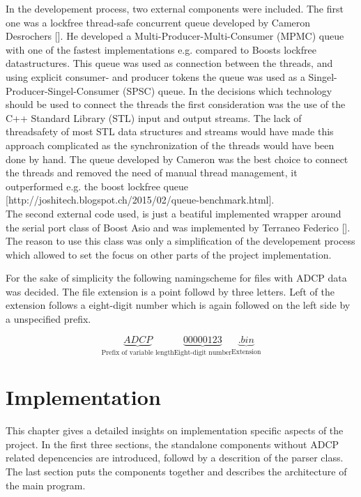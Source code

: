 In the developement process, two external components were included. The first one was a lockfree thread-safe concurrent queue developed by Cameron Desrochers []. He developed a Multi-Producer-Multi-Consumer (MPMC) queue with one of the fastest implementations e.g. compared to Boosts lockfree datastructures. This queue was used as connection between the threads, and using explicit consumer- and producer tokens the queue was used as a Singel-Producer-Singel-Consumer (SPSC) queue. In the decisions which technology should be used to connect the threads the first consideration was the use of the C++ Standard Library (STL)  input and output streams. The lack of threadsafety of most STL data structures and streams would have made this approach complicated as the synchronization of the threads would have been done by hand. The queue developed by Cameron was the best choice to connect the threads and removed the need of manual thread management, it outperformed e.g. the boost lockfree queue [http://joshitech.blogspot.ch/2015/02/queue-benchmark.html].\\
The second external code used, is just a beatiful implemented wrapper around the serial port class of Boost Asio and was implemented by Terraneo Federico []. The reason to use this class was only a simplification of the developement process which allowed to set the focus on other parts of the project implementation.

For the sake of simplicity the following namingscheme for files with ADCP data was decided. The file extension is a point followd by three letters. Left of the extension follows a  eight-digit number which is again followed on the left side by a unspecified prefix.

$$ \underbrace{ADCP}_{\text{Prefix of variable length}}\underbrace{00000123}_{\text{Eight-digit number}}\underbrace{.bin}_{\text{Extension}}$$

\chapter{Implementation}
This chapter gives a detailed insights on implementation specific aspects of the project. In the first three sections, the standalone components without ADCP related depencencies  are introduced, followd by a descrition of the parser class. The last section puts the components together and describes the architecture of the main program.  
